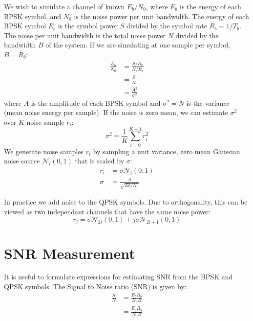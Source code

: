 \documentclass{article}
\begin{document}
We wish to simulate a channel of known $E_b/N_0$, where $E_b$ is the energy of each BPSK symbol, and $N_0$ is the noise power per unit bandwidth.  The energy of each BPSK symbol $E_b$ is the symbol power $S$ divided by the symbol rate $R_b=1/T_b$.  The noise per unit bandwidth is the total noise power $N$ divided by the bandwidth $B$ of the system.  If we are simulating at one sample per symbol, $B=R_b$:
\begin{equation}
\begin{split}
\frac{E_b}{N_0} &= \frac{S/R_b}{N/R_b} \\
                &= \frac{S}{N} \\
                &= \frac{A^2}{\sigma^2}
\end{split}
\end{equation}
where $A$ is the amplitude of each BPSK symbol and $\sigma^2=N$ is the variance (mean noise energy per sample).  If the noise is zero mean, we can estimate $\sigma^2$ over $K$ noise sample $r_i$:
\begin{equation}
\sigma^2 = \frac{1}{K}\sum_{i=0}^{K-1}r_i^2
\end{equation}
We generate noise samples $r_i$ by sampling a unit variance, zero mean Gaussian noise source $\mathcal{N}_i(0,1)$ that is scaled by $\sigma$:
\begin{equation}
\begin{split}
r_i &= \sigma \mathcal{N}_i(0,1) \\
\sigma &= \frac{A}{\sqrt{Eb/N_0}}
\end{split}
\end{equation}

In practice we add noise to the QPSK symbols.  Due to orthogonality, this can be viewed as two independant channels that have the same noise power:
\begin{equation}
r_i = \sigma \mathcal{N}_{2i}(0,1) + j\sigma\mathcal{N}_{2i+1}(0,1)
\end{equation}

\section{SNR Measurement}

It is useful to formulate expressions for estimating SNR from the BPSK and QPSK symbols.  The Signal to Noise ratio (SNR) is given by:
\begin{equation}
\label{eq:snr_theory}
\begin{split}
\frac{S}{N} &= \frac{E_bR_b}{N_0B} \\
            &= \frac{E_qR_q}{N_0B}
\end{split}
\end{equation}
\end{document}

